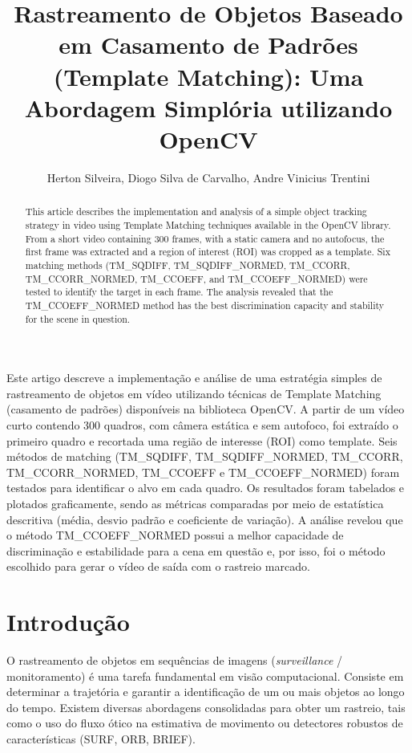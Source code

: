 \documentclass[12pt]{article}
\title{Rastreamento de Objetos Baseado em Casamento de Padrões (Template Matching): Uma Abordagem Simplória utilizando OpenCV}
\author{Herton Silveira\inst{1}, Diogo Silva de Carvalho\inst{1}, Andre Vinicius Trentini\inst{1}}
\begin{document}
\maketitle

\begin{abstract}
This article describes the implementation and analysis of a simple object tracking strategy in video using Template Matching techniques available in the OpenCV library. From a short video containing 300 frames, with a static camera and no autofocus, the first frame was extracted and a region of interest (ROI) was cropped as a template. Six matching methods (TM\_SQDIFF, TM\_SQDIFF\_NORMED, TM\_CCORR, TM\_CCORR\_NORMED, TM\_CCOEFF, and TM\_CCOEFF\_NORMED) were tested to identify the target in each frame. The analysis revealed that the TM\_CCOEFF\_NORMED method has the best discrimination capacity and stability for the scene in question.
\end{abstract}

\begin{resumo}
Este artigo descreve a implementação e análise de uma estratégia simples de rastreamento de objetos em vídeo utilizando técnicas de Template Matching (casamento de padrões) disponíveis na biblioteca OpenCV. A partir de um vídeo curto contendo 300 quadros, com câmera estática e sem autofoco, foi extraído o primeiro quadro e recortada uma região de interesse (ROI) como template. Seis métodos de matching (TM\_SQDIFF, TM\_SQDIFF\_NORMED, TM\_CCORR, TM\_CCORR\_NORMED, TM\_CCOEFF e TM\_CCOEFF\_NORMED) foram testados para identificar o alvo em cada quadro. Os resultados foram tabelados e plotados graficamente, sendo as métricas comparadas por meio de estatística descritiva (média, desvio padrão e coeficiente de variação). A análise revelou que o método TM\_CCOEFF\_NORMED possui a melhor capacidade de discriminação e estabilidade para a cena em questão e, por isso, foi o método escolhido para gerar o vídeo de saída com o rastreio marcado.
\end{resumo}

\section{Introdução}
O rastreamento de objetos em sequências de imagens (\textit{surveillance} / monitoramento) é uma tarefa fundamental em visão computacional. Consiste em determinar a trajetória e garantir a identificação de um ou mais objetos ao longo do tempo. Existem diversas abordagens consolidadas para obter um rastreio, tais como o uso do fluxo ótico na estimativa de movimento ou detectores robustos de características (SURF, ORB, BRIEF).
\end{document}
